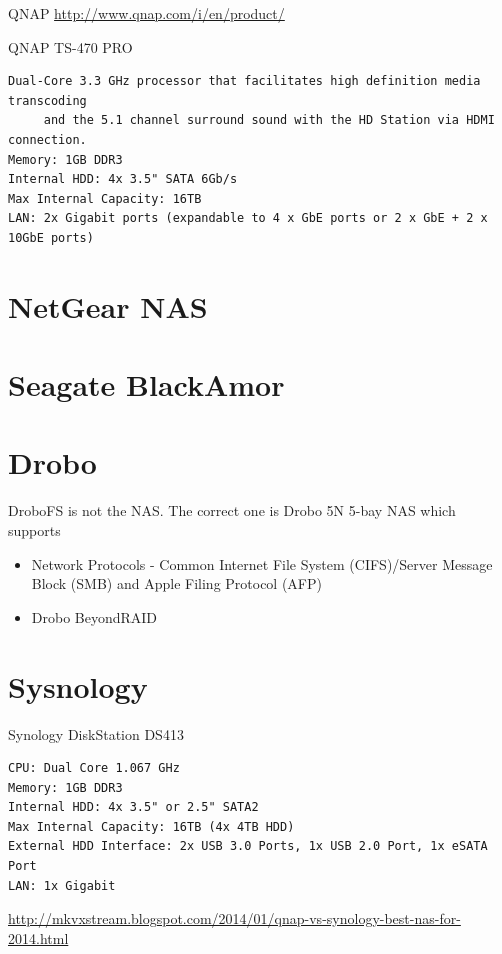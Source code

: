 QNAP \url{http://www.qnap.com/i/en/product/}

QNAP TS-470 PRO
\begin{verbatim}
Dual-Core 3.3 GHz processor that facilitates high definition media transcoding
     and the 5.1 channel surround sound with the HD Station via HDMI connection.  
Memory: 1GB DDR3
Internal HDD: 4x 3.5" SATA 6Gb/s
Max Internal Capacity: 16TB
LAN: 2x Gigabit ports (expandable to 4 x GbE ports or 2 x GbE + 2 x 10GbE ports)
\end{verbatim}

\section{NetGear NAS}

\section{Seagate BlackAmor}
\label{sec:BlackAmor_NAS}


\section{Drobo}
\label{sec:Drobo_NAS}

DroboFS is not the NAS. The correct one is Drobo 5N 5-bay NAS which supports
\begin{itemize}
  \item Network Protocols - Common Internet File System (CIFS)/Server Message
  Block (SMB) and Apple Filing Protocol (AFP)
  
  \item Drobo BeyondRAID
  
\end{itemize}



\section{Sysnology}
\label{sec:Sysnology}

Synology DiskStation DS413
\begin{verbatim}
CPU: Dual Core 1.067 GHz 
Memory: 1GB DDR3 
Internal HDD: 4x 3.5" or 2.5" SATA2
Max Internal Capacity: 16TB (4x 4TB HDD) 
External HDD Interface: 2x USB 3.0 Ports, 1x USB 2.0 Port, 1x eSATA Port 
LAN: 1x Gigabit 
\end{verbatim}
\url{http://mkvxstream.blogspot.com/2014/01/qnap-vs-synology-best-nas-for-2014.html}

